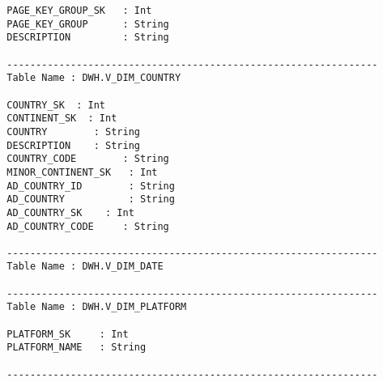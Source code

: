 \begin{verbatim}
  PAGE_KEY_GROUP_SK   : Int                                                                      
  PAGE_KEY_GROUP      : String                                                                      
  DESCRIPTION         : String                                                                      

  ----------------------------------------------------------------
  Table Name : DWH.V_DIM_COUNTRY

  COUNTRY_SK  : Int                                                                              
  CONTINENT_SK  : Int                                                                         
  COUNTRY        : String                                                                           
  DESCRIPTION    : String                                                                           
  COUNTRY_CODE        : String                                                                       
  MINOR_CONTINENT_SK   : Int                                                                                                                         
  AD_COUNTRY_ID        : String                                                                      
  AD_COUNTRY           : String                                                                      
  AD_COUNTRY_SK    : Int                                                                         
  AD_COUNTRY_CODE     : String                                                                       

  ----------------------------------------------------------------
  Table Name : DWH.V_DIM_DATE

  ----------------------------------------------------------------
  Table Name : DWH.V_DIM_PLATFORM

  PLATFORM_SK     : Int                                                                          
  PLATFORM_NAME   : String                                                                          

  ----------------------------------------------------------------


\end{verbatim}
